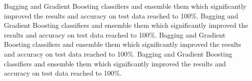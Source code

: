 \documentclass[journal, twoside, final]{IEEEtran}
\begin{document}
Bagging and Gradient Boosting classifiers and ensemble them which significantly improved the results and accuracy on test data reached to 100\%. 
Bagging and Gradient Boosting classifiers and ensemble them which significantly improved the results and accuracy on test data reached to 100\%. 
Bagging and Gradient Boosting classifiers and ensemble them which significantly improved the results and accuracy on test data reached to 100\%. Bagging and Gradient Boosting classifiers and ensemble them which significantly improved the results and accuracy on test data reached to 100\%. 


\end{document}
